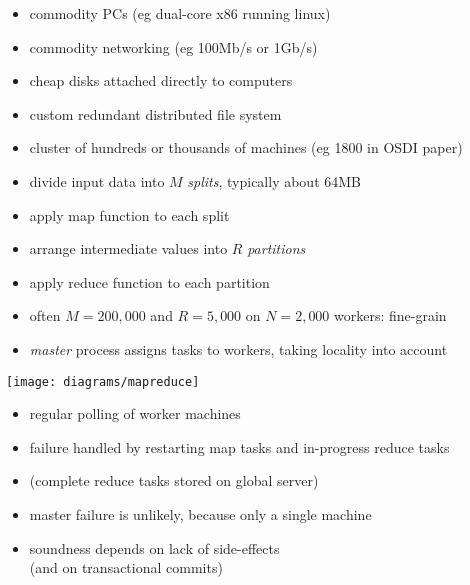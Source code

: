 \documentclass{sepslide-soa}
\begin{document}
\begin{slide}
\begin{itemize}
\item commodity PCs (eg dual-core x86 running linux)
\item commodity networking (eg 100Mb/s or 1Gb/s)
\item cheap disks attached directly to computers
\item custom redundant distributed file system
\item cluster of hundreds or thousands of machines (eg 1800 in OSDI paper)
\end{itemize}
\end{slide}

\begin{slide}
\begin{itemize}
\item divide input data into $M$ \emph{splits}, typically about 64MB
\item apply map function to each split
\item arrange intermediate values into $R$ \emph{partitions}
\item apply reduce function to each partition
\item often $M=200,000$ and $R=5,000$ on $N=2,000$ workers: fine-grain
\item \emph{master} process assigns tasks to workers, taking locality into account
\end{itemize}
\end{slide}

\begin{slide}
\texttt{[image: diagrams/mapreduce]}
\end{slide}

\begin{slide}
\begin{itemize}
\item regular polling of worker machines
\item failure handled by restarting map tasks and in-progress reduce tasks
\item (complete reduce tasks stored on global server)
\item master failure is unlikely, because only a single machine
\item soundness depends on lack of side-effects \\ (and on transactional commits)
\end{itemize}
\end{slide}
\end{document}
